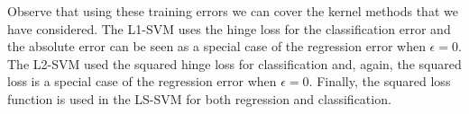 Observe that using these training errors we can cover the kernel methods that we have considered. The L1-SVM uses the hinge loss for the classification error and the absolute error can be seen as a special case of the regression error when $\epsilon = 0$. The L2-SVM used the squared hinge loss for classification and, again, the squared loss is a special case of the regression error when $\epsilon=0$. Finally, the squared loss function is used in the LS-SVM for both regression and classification.

